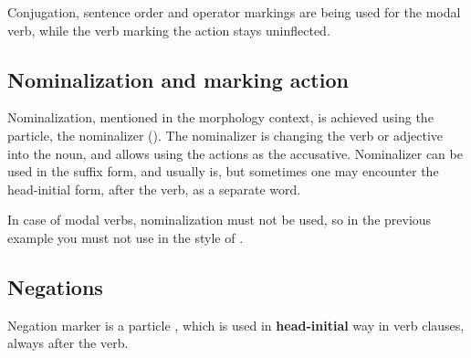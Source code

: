 Conjugation, sentence order and operator markings are being used for the modal
verb, while the verb marking the action stays uninflected.



\subsection{Nominalization and marking action}

Nominalization, mentioned in the morphology context, is achieved using the
 particle, the nominalizer (\Nmlz{}). The nominalizer is changing the
verb or adjective into the noun, and allows using the actions as the accusative.
Nominalizer can be used in the suffix form, and usually is, but sometimes one
may encounter the head-initial form, after the verb, as a separate word.



In case of modal verbs, nominalization must not be used, so in the previous
example  you must not use  in
the style of .

\subsection{Negations}

Negation marker is a particle , which is used in
\textbf{head-initial} way in verb clauses, always after the verb.




